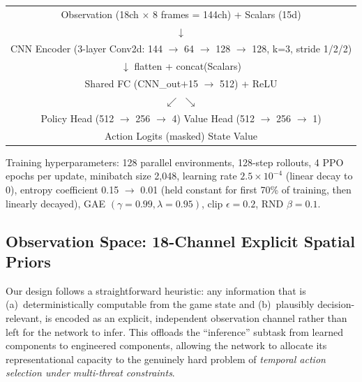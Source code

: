 \documentclass[11pt,a4paper]{article}
\theoremstyle{definition}
\begin{document}
\begin{center}
\begin{tabular}{c}
Observation (18ch $\times$ 8 frames = 144ch) + Scalars (15d) \\
$\downarrow$ \\
CNN Encoder (3-layer Conv2d: 144 $\to$ 64 $\to$ 128 $\to$ 128, k=3, stride 1/2/2) \\
$\downarrow$ flatten + concat(Scalars) \\
Shared FC (CNN\_out$+$15 $\to$ 512) + ReLU \\
$\swarrow$ \hspace{4cm} $\searrow$ \\
Policy Head (512 $\to$ 256 $\to$ 4) \hspace{1.5cm} Value Head (512 $\to$ 256 $\to$ 1) \\
Action Logits (masked) \hspace{3.2cm} State Value \\
\end{tabular}
\end{center}

Training hyperparameters: 128 parallel environments, 128-step rollouts, 4 PPO epochs per update, minibatch size 2,048, learning rate $2.5\times10^{-4}$ (linear decay to 0), entropy coefficient 0.15 $\to$ 0.01 (held constant for first 70\% of training, then linearly decayed), GAE $(\gamma=0.99, \lambda=0.95)$, clip $\epsilon=0.2$, RND $\beta=0.1$.

\subsection{Observation Space: 18-Channel Explicit Spatial Priors}

Our design follows a straightforward heuristic: any information that is (a)~deterministically computable from the game state and (b)~plausibly decision-relevant, is encoded as an explicit, independent observation channel rather than left for the network to infer.
This offloads the ``inference'' subtask from learned components to engineered components, allowing the network to allocate its representational capacity to the genuinely hard problem of \textit{temporal action selection under multi-threat constraints}.
\end{document}
